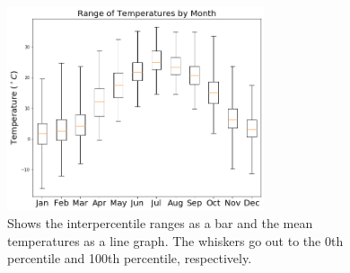 \documentclass[11pt]{report}
\begin{document}
\begin{figure}[b]
	\centering
	\includegraphics[width=0.675\textwidth]{Figures/Temp_range.png}
	\caption[Temperature range for Princeton
          (2017--2021)]{\label{Temp_range} Shows the interpercentile ranges
          as a bar and the mean temperatures as a line graph. The whiskers
          go out to the 0th percentile and 100th percentile, respectively.}
\end{figure}
\clearpage
\end{document}

